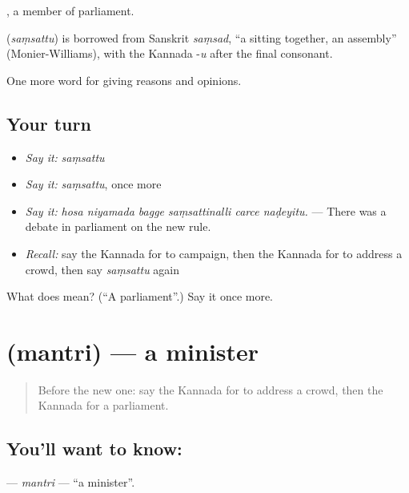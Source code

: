 , a member of parliament.

\begin{cousinweb}
\textbf{} (\emph{saṃsattu}) is borrowed from Sanskrit \emph{saṃsad}, \textquotedblleft{}a sitting together, an assembly\textquotedblright{} (Monier-Williams), with the Kannada -\emph{u} after the final consonant.
\end{cousinweb}

\begin{grammarlens}[title={What you've built}]
One more word for giving reasons and opinions.
\end{grammarlens}

\subsection*{Your turn}
\begin{itemize}
\raggedright
  \item \emph{Say it:} \emph{saṃsattu}
  \item \emph{Say it:} \emph{saṃsattu}, once more
  \item \emph{Say it:} \emph{hosa niyamada bagge saṃsattinalli carce naḍeyitu.} — There was a debate in parliament on the new rule.
  \item \emph{Recall:} say the Kannada for to campaign, then the Kannada for to address a crowd, then say \emph{saṃsattu} again
\end{itemize}

\begin{tcolorbox}[breakable,colback=teal!4,colframe=teal!35!black,title={Before you move on}]
What does  mean? (\textquotedblleft{}A parliament\textquotedblright{}.) Say it once more.
\end{tcolorbox}
\section[\texorpdfstring{\kn{ಮಂತ್ರಿ} (mantri)}{ಮಂತ್ರಿ (mantri)}]{ (mantri) — a minister}

\label{lesson:KA-C393-mantri}



\begin{quote}
Before the new one: say the Kannada for to address a crowd, then the Kannada for a parliament.
\end{quote}

\subsection*{You'll want to know: }
\textbf{} — \emph{mantri} — \textquotedblleft{}a minister\textquotedblright{}.

